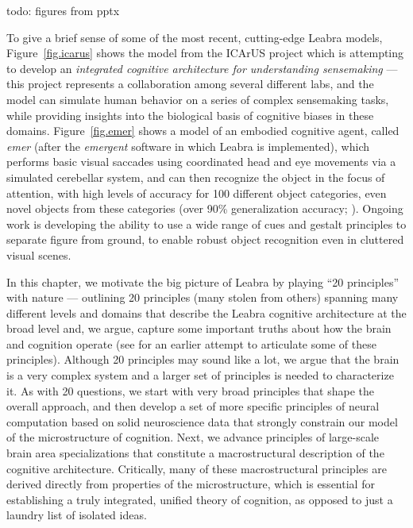 \documentclass[11pt,twoside]{article}
\begin{document}
todo: figures from pptx

To give a brief sense of some of the most recent, cutting-edge Leabra models,
Figure~\ref{fig.icarus} shows the model from the ICArUS project which is
attempting to develop an {\em integrated cognitive architecture for
  understanding sensemaking} --- this project represents a collaboration among
several different labs, and the model can simulate human behavior on a series
of complex sensemaking tasks, while providing insights into the biological
basis of cognitive biases in these domains.  Figure~\ref{fig.emer} shows a
model of an embodied cognitive agent, called {\em emer} (after the {\em
  emergent} software in which Leabra is implemented), which performs basic
visual saccades using coordinated head and eye movements via a simulated
cerebellar system, and can then recognize the object in the focus of
attention, with high levels of accuracy for 100 different object categories,
even novel objects from these categories (over 90\% generalization accuracy;
\cite{OReillyEtAlLvis}).  Ongoing work is developing the ability to use a wide
range of cues and gestalt principles to separate figure from ground, to enable
robust object recognition even in cluttered visual scenes.

In this chapter, we motivate the big picture of Leabra by playing ``20
principles'' with nature --- outlining 20 principles (many stolen from others)
spanning many different levels and domains that describe the Leabra cognitive architecture at the broad level and, we argue, capture some important
truths about how the brain and cognition operate (see  for
an earlier attempt to articulate some of these principles).  Although 20
principles may sound like a lot, we argue that the brain is a very complex
system and a larger set of principles is needed to characterize it.  As with
20 questions, we start with very broad principles that shape the overall
approach, and then develop a set of more specific principles of neural
computation based on solid neuroscience data that strongly constrain our model
of the microstructure of cognition.  Next, we advance principles of
large-scale brain area specializations that constitute a macrostructural
description of the cognitive architecture.  Critically, many of these
macrostructural principles are derived directly from properties of the
microstructure, which is essential for establishing a truly integrated,
unified theory of cognition, as opposed to just a laundry list of isolated
ideas.
\end{document}
